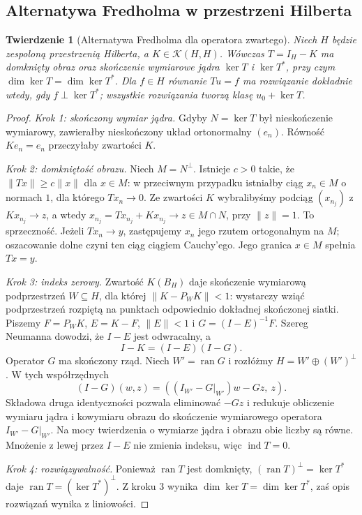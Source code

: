 \documentclass[11pt,a4paper]{article}
\numberwithin{equation}{section}
\theoremstyle{plain}
\newtheorem{twierdzenie}{Twierdzenie}[section]
\theoremstyle{definition}
\theoremstyle{remark}
\begin{document}
\subsection{Alternatywa Fredholma w przestrzeni Hilberta}

\begin{twierdzenie}[Alternatywa Fredholma dla operatora zwartego]
\label{thm:fredholm-hilbert30}
Niech $H$ będzie zespoloną przestrzenią Hilberta, a
$K\in\mathcal K(H,H)$. Wówczas $T=I_H-K$ ma domknięty
obraz oraz skończenie wymiarowe jądra $\ker T$ i $\ker T^*$,
przy czym $\dim\ker T=\dim\ker T^*$.
Dla $f\in H$ równanie $Tu=f$ ma rozwiązanie dokładnie wtedy,
gdy $f\perp\ker T^*$; wszystkie rozwiązania tworzą
klasę $u_0+\ker T$.
\end{twierdzenie}
\begin{proof}
\emph{Krok 1: skończony wymiar jądra.}
Gdyby $N=\ker T$ był nieskończenie wymiarowy, zawierałby
nieskończony układ ortonormalny $(e_n)$. Równość $Ke_n=e_n$
przeczyłaby zwartości $K$.

\emph{Krok 2: domkniętość obrazu.}
Niech $M=N^\perp$. Istnieje $c>0$ takie, że
$\|Tx\|\ge c\|x\|$ dla $x\in M$: w przeciwnym przypadku
istniałby ciąg $x_n\in M$ o normach $1$, dla którego
$Tx_n\to0$. Ze zwartości $K$ wybralibyśmy podciąg
$(x_{n_j})$ z $Kx_{n_j}\to z$, a wtedy
$x_{n_j}=Tx_{n_j}+Kx_{n_j}\to z\in M\cap N$, przy $\|z\|=1$.
To sprzeczność. Jeżeli $Tx_n\to y$, zastępujemy $x_n$
jego rzutem ortogonalnym na $M$; oszacowanie dolne
czyni ten ciąg ciągiem Cauchy'ego. Jego granica $x\in M$
spełnia $Tx=y$.

\emph{Krok 3: indeks zerowy.}
Zwartość $K(B_H)$ daje skończenie wymiarową podprzestrzeń
$W\subseteq H$, dla której
$\|K-P_WK\|<1$: wystarczy wziąć podprzestrzeń
rozpiętą na punktach odpowiednio dokładnej skończonej siatki.
Piszemy $F=P_WK$, $E=K-F$, $\|E\|<1$ i
$G=(I-E)^{-1}F$. Szereg Neumanna dowodzi, że $I-E$
jest odwracalny, a
\[I-K=(I-E)(I-G).\]
Operator $G$ ma skończony rząd. Niech $W'=\operatorname{ran}G$
i rozłóżmy $H=W'\oplus(W')^\perp$.
W tych współrzędnych
\[(I-G)(w,z)=((I_{W'}-G|_{W'})w-Gz,\ z).\]
Składowa druga identyczności pozwala eliminować $-Gz$
i redukuje obliczenie wymiaru jądra i kowymiaru obrazu
do skończenie wymiarowego operatora $I_{W'}-G|_{W'}$.
Na mocy twierdzenia o wymiarze jądra i obrazu obie liczby są
równe. Mnożenie z lewej przez $I-E$ nie zmienia
indeksu, więc $\operatorname{ind}T=0$.

\emph{Krok 4: rozwiązywalność.}
Ponieważ $\operatorname{ran}T$ jest domknięty,
$(\operatorname{ran}T)^\perp=\ker T^*$ daje
$\operatorname{ran}T=(\ker T^*)^\perp$. Z kroku 3 wynika
$\dim\ker T=\dim\ker T^*$, zaś opis rozwiązań
wynika z liniowości.
\end{proof}
\end{document}
